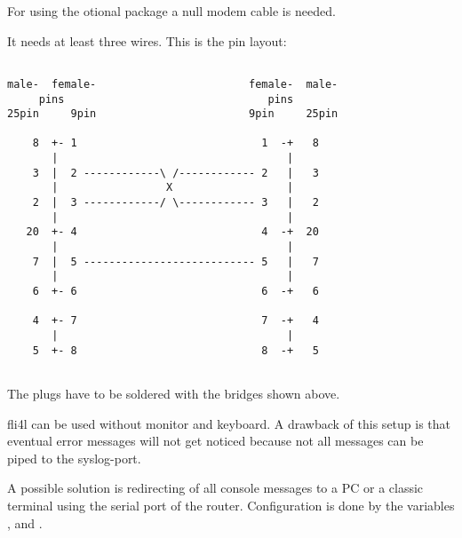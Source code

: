 

    For using the otional package 
    a null modem cable is needed.

    It needs at least three wires. This is the pin layout:

\begin{example}
\begin{verbatim}

male-  female-                        female-  male-
     pins                                pins
25pin     9pin                        9pin     25pin

    8  +- 1                             1  -+   8
       |                                    |
    3  |  2 ------------\ /------------ 2   |   3
       |                 X                  |
    2  |  3 ------------/ \------------ 3   |   2
       |                                    |
   20  +- 4                             4  -+  20
       |                                    |
    7  |  5 --------------------------- 5   |   7
       |                                    |
    6  +- 6                             6  -+   6

    4  +- 7                             7  -+   4
       |                                    |
    5  +- 8                             8  -+   5


\end{verbatim}
\end{example}


    The plugs have to be soldered with the bridges shown above.


    fli4l can be used without monitor and keyboard. A drawback of this 
    setup is that eventual error messages will not get noticed because 
    not all messages can be piped to the syslog-port.

    A possible solution is redirecting of all console messages to a PC 
    or a classic terminal using the serial port of the router.
    Configuration is done by the variables
    ,
     and
    .

